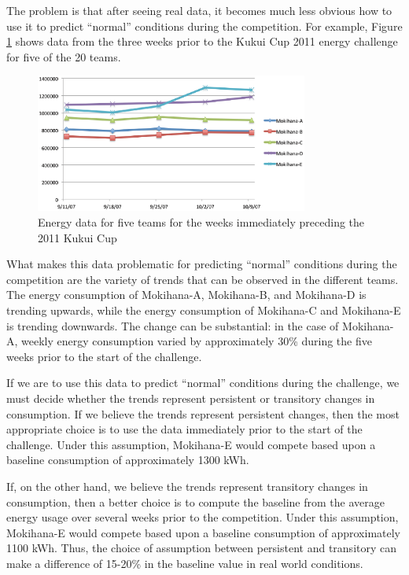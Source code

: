 \documentclass[jou]{apa} %
\begin{document}
The problem is that after seeing real data, it becomes much less obvious how to use it to
predict ``normal'' conditions during the competition.  For example, Figure
\ref{fig:kukuicup-baseline-data-chart} shows data from the three weeks prior to the
Kukui Cup 2011 energy challenge for five of the 20 teams.

\begin{figure}[htbp]
\begin{center}
\includegraphics[width=0.8\textwidth]{kc-baselines.2.eps}
\caption{Energy data for five teams for the weeks immediately preceding the 2011 Kukui Cup}
\label{fig:kukuicup-baseline-data-chart}
\end{center}
\end{figure}


What makes this data problematic for predicting ``normal'' conditions during the
competition are the variety of trends that can be observed in the different teams.  The
energy consumption of Mokihana-A, Mokihana-B, and Mokihana-D is trending upwards, while
the energy consumption of Mokihana-C and Mokihana-E is trending downwards.  The change can
be substantial: in the case of Mokihana-A, weekly energy consumption varied by approximately 30\% 
during the five weeks prior to the start of the challenge.

If we are to use this data to predict ``normal'' conditions during the challenge, we must
decide whether the trends represent persistent or transitory changes in consumption.  If we
believe the trends represent persistent changes, then the most appropriate choice is to
use the data immediately prior to the start of the challenge.  Under this assumption,
Mokihana-E would compete based upon a baseline consumption of approximately 1300 kWh.  

If, on the other hand, we believe the trends represent transitory changes in consumption,
then a better choice is to compute the baseline from the average energy usage over several
weeks prior to the competition.  Under this assumption, Mokihana-E would compete based
upon a baseline consumption of approximately 1100 kWh.  Thus, the choice of assumption
between persistent and transitory can make a difference of 15-20\% in the baseline value
in real world conditions.
\end{document}
